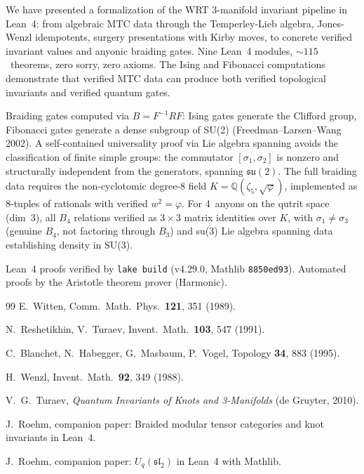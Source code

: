 \documentclass[aps,prl,twocolumn,superscriptaddress]{revtex4-2}
\begin{document}
We have presented a formalization of the WRT 3-manifold invariant
pipeline in Lean~4: from algebraic MTC data through the Temperley-Lieb
algebra, Jones-Wenzl idempotents, surgery presentations with Kirby
moves, to concrete verified invariant values and anyonic braiding
gates. Nine Lean~4 modules, ${\sim}115$~theorems, zero sorry, zero
axioms. The Ising and Fibonacci computations demonstrate that verified
MTC data can produce both verified topological invariants and verified
quantum gates.

Braiding gates computed via $B = F^{-1}RF$: Ising gates generate the
Clifford group, Fibonacci gates generate a dense subgroup of SU(2)
(Freedman--Larsen--Wang 2002). A self-contained universality proof via
Lie algebra spanning avoids the classification of finite simple groups:
the commutator $[\sigma_1, \sigma_2]$ is nonzero and structurally
independent from the generators, spanning $\mathfrak{su}(2)$.
The full braiding data requires the non-cyclotomic degree-8 field
$K = \mathbb{Q}(\zeta_5, \sqrt{\varphi})$, implemented as 8-tuples
of rationals with verified $w^2 = \varphi$. For 4~anyons on the
qutrit space (dim~3), all $B_4$ relations verified as $3 \times 3$
matrix identities over $K$, with $\sigma_1 \neq \sigma_3$ (genuine
$B_4$, not factoring through $B_3$) and su(3) Lie algebra spanning
data establishing density in SU(3).

\begin{acknowledgments}
Lean~4 proofs verified by \texttt{lake build} (v4.29.0,
Mathlib \texttt{8850ed93}). Automated proofs by the Aristotle
theorem prover (Harmonic).
\end{acknowledgments}

\begin{thebibliography}{99}
E.~Witten, Comm.\ Math.\ Phys.\ \textbf{121}, 351 (1989).

N.~Reshetikhin, V.~Turaev, Invent.\ Math.\ \textbf{103}, 547 (1991).

C.~Blanchet, N.~Habegger, G.~Masbaum, P.~Vogel, Topology \textbf{34}, 883 (1995).

H.~Wenzl, Invent.\ Math.\ \textbf{92}, 349 (1988).

V.~G.~Turaev, \emph{Quantum Invariants of Knots and 3-Manifolds} (de Gruyter, 2010).

J.~Roehm, companion paper: Braided modular tensor categories and knot invariants in Lean~4.

J.~Roehm, companion paper: $U_q(\mathfrak{sl}_2)$ in Lean~4 with Mathlib.
\end{thebibliography}
\end{document}
